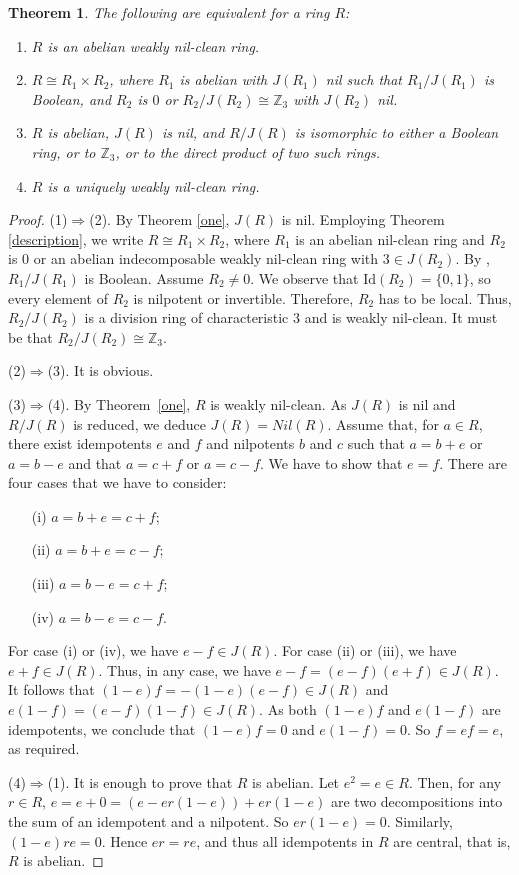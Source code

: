 \documentclass[12]{amsart}
\newtheorem{thm}{Theorem}
\theoremstyle{definition}
\numberwithin{equation}{section}
\begin{document}
\begin{thm}\label{fine}
The following are equivalent for a ring $R$:
\begin{enumerate}
\item $R$ is an abelian weakly nil-clean ring.
\item $R\cong R_1\times R_2$, where $R_1$ is abelian with $J(R_1)$ nil such that $R_1/J(R_1)$ is Boolean, and $R_2$ is $0$ or $R_2/J(R_2)\cong\mathbb{Z}_3$ with $J(R_2)$ nil.
\item $R$ is abelian, $J(R)$ is nil, and $R/J(R)$ is isomorphic to either a
Boolean ring, or to $\mathbb Z_3$, or to the direct product of two such rings.

\item $R$ is a uniquely weakly nil-clean ring.
\end{enumerate}
\end{thm}

\begin{proof}
(1)$\Rightarrow$(2). By Theorem \ref{one}, $J(R)$ is nil.
Employing Theorem \ref{description}, we write $R\cong R_1\times R_2$, where $R_1$ is an abelian nil-clean ring and $R_2$ is $0$ or an abelian indecomposable weakly nil-clean ring with $3\in J(R_2)$. By \cite[Proposition 3.18 and Corollary 3.19]{D13}, $R_1/J(R_1)$ is Boolean. Assume $R_2\not= 0$. We observe that $\mathrm{Id}(R_2)=\{0,1\}$, so every element of $R_2$ is nilpotent or invertible. Therefore, $R_2$ has to be local. Thus, $R_2/J(R_2)$ is a division ring of characteristic $3$ and is weakly nil-clean. It must be that $R_2/J(R_2)\cong \mathbb Z_3$. 

(2)$\Rightarrow$(3). It is obvious.

(3)$\Rightarrow$(4). By Theorem~\ref{one}, $R$ is weakly nil-clean. As $J(R)$ is nil and $R/J(R)$ is reduced, we deduce $J(R)=Nil(R)$. Assume that, for $a\in R$, there exist idempotents $e$ and $f$ and nilpotents $b$ and $c$ such that $a=b+e$ or $a=b-e$ and that $a=c+f$ or $a=c-f$. We have to show that $e=f$. There are four cases that we have to consider:
\begin{itemize}
\item[(i)] $a=b+e=c+f$; \item[(ii)] $a=b+e=c-f$; \item[(iii)] $a=b-e=c+f$; \item[(iv)] $a=b-e=c-f$.\end{itemize}
For case (i) or (iv), we have $e-f\in J(R)$. For case (ii) or (iii), we have $e+f\in J(R)$. Thus, in any case,
we have $e-f=(e-f)(e+f)\in J(R)$. It follows that $(1-e)f=-(1-e)(e-f)\in J(R)$ and $e(1-f)=(e-f)(1-f)\in J(R)$. As both $(1-e)f$ and $e(1-f)$ are idempotents, we conclude that $(1-e)f=0$ and $e(1-f)=0$. So $f=ef=e$, as required.

(4)$\Rightarrow$(1). It is enough to prove that $R$ is abelian. Let $e^2=e\in R$. Then, for any $r\in R$,
$e=e+0=(e-er(1-e))+er(1-e)$ are two decompositions into  the sum of an idempotent and a nilpotent. So
$er(1-e)=0$. Similarly, $(1-e)re=0$. Hence $er=re$, and thus all idempotents in $R$ are central, that is,
$R$ is abelian.
\end{proof}
\end{document}
